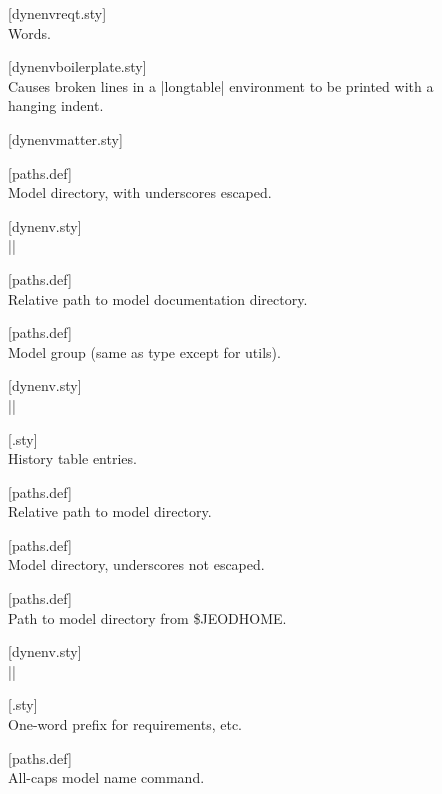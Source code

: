 \begin{description}
\item[] \hfill [dynenvreqt.sty] \\
  Words.
\item[] \hfill [dynenvboilerplate.sty] \\
  Causes broken lines in a |longtable| environment to be printed with a
  hanging indent.
\item[]
  \hfill [dynenvmatter.sty] \\
\item[] \hfill [paths.def] \\
  Model directory, with underscores escaped.
\item[] \hfill [dynenv.sty] \\
  |{\MODELDIR\xspace}|
\item[] \hfill [paths.def] \\
  Relative path to model documentation directory.
\item[] \hfill [paths.def] \\
  Model group (same as type except for utils).
\item[] \hfill [dynenv.sty] \\
  |{\MODELGROUPx\xspace}|
\item[] \hfill [.sty] \\
  History table entries.
\item[] \hfill [paths.def] \\
  Relative path to model directory.
\item[] \hfill [paths.def] \\
  Model directory, underscores not escaped.
\item[] \hfill [paths.def] \\
  Path to model directory from \$JEODHOME.
\item[] \hfill [dynenv.sty] \\
  |{\MODELPATH\xspace}|
\item[] \hfill [.sty] \\
  One-word prefix for requirements, etc.
\item[] \hfill [paths.def] \\
  All-caps model name command.

\end{description}
